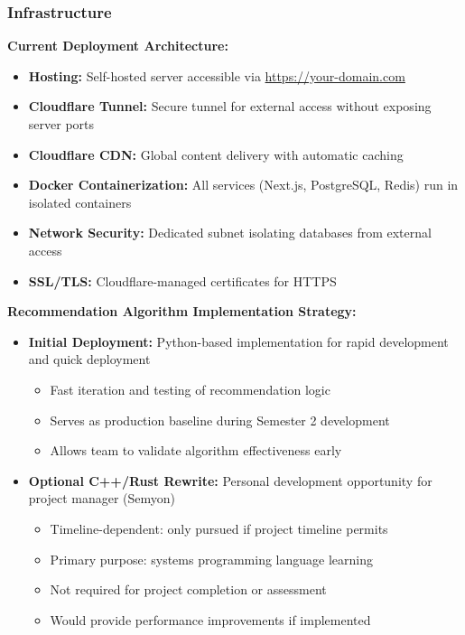 \documentclass[12pt,a4paper]{article}
\begin{document}
\subsubsection{Infrastructure}

\textbf{Current Deployment Architecture:}
\begin{itemize}
    \item \textbf{Hosting:} Self-hosted server accessible via \url{https://your-domain.com}
    \item \textbf{Cloudflare Tunnel:} Secure tunnel for external access without exposing server ports
    \item \textbf{Cloudflare CDN:} Global content delivery with automatic caching
    \item \textbf{Docker Containerization:} All services (Next.js, PostgreSQL, Redis) run in isolated containers
    \item \textbf{Network Security:} Dedicated subnet isolating databases from external access
    \item \textbf{SSL/TLS:} Cloudflare-managed certificates for HTTPS
\end{itemize}

\textbf{Recommendation Algorithm Implementation Strategy:}

\begin{itemize}
    \item \textbf{Initial Deployment:} Python-based implementation for rapid development and quick deployment
    \begin{itemize}
        \item Fast iteration and testing of recommendation logic
        \item Serves as production baseline during Semester 2 development
        \item Allows team to validate algorithm effectiveness early
    \end{itemize}

    \item \textbf{Optional C++/Rust Rewrite:} Personal development opportunity for project manager (Semyon)
    \begin{itemize}
        \item Timeline-dependent: only pursued if project timeline permits
        \item Primary purpose: systems programming language learning
        \item Not required for project completion or assessment
        \item Would provide performance improvements if implemented
    \end{itemize}
\end{itemize}
\end{document}
